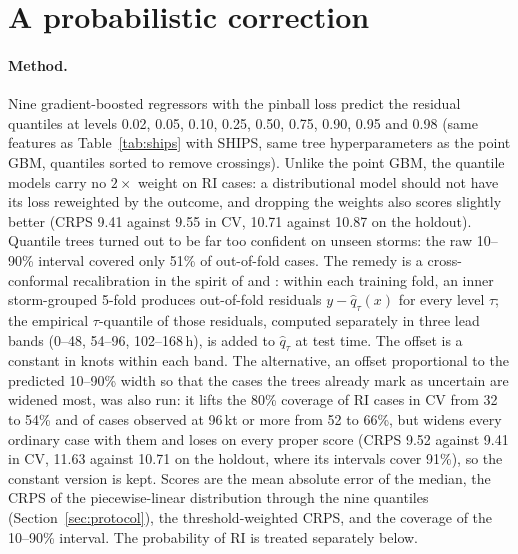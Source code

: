 \documentclass[11pt]{article}
\begin{document}
\FloatBarrier
\section{A probabilistic correction}\label{sec:prob}

\paragraph{Method.} Nine gradient-boosted regressors with the pinball loss predict the residual
quantiles at levels 0.02, 0.05, 0.10, 0.25, 0.50, 0.75, 0.90, 0.95 and 0.98 (same features as
Table~\ref{tab:ships} with SHIPS, same tree hyperparameters as the point GBM, quantiles sorted to
remove crossings). Unlike the point GBM, the quantile models carry no $2\times$ weight on RI
cases: a distributional model should not have its loss reweighted by the outcome, and dropping the
weights also scores slightly better (CRPS 9.41 against 9.55 in CV, 10.71 against 10.87 on the
holdout). Quantile trees turned out to be far too confident on
unseen storms: the raw 10--90\% interval covered only 51\% of out-of-fold cases. The remedy is a
cross-conformal recalibration in the spirit of \citet{romano2019cqr} and \citet{barber2021cvplus}:
within each training fold, an inner storm-grouped 5-fold produces out-of-fold residuals
$y - \hat q_\tau(x)$ for every level $\tau$; the empirical $\tau$-quantile of those residuals,
computed separately in three lead bands (0--48, 54--96, 102--168\,h), is added to $\hat q_\tau$
at test time. The offset is a constant in knots within each band. The alternative, an offset
proportional to the predicted 10--90\% width so that the cases the trees
already mark as uncertain are widened most, was also run: it lifts the 80\% coverage of RI cases
in CV from 32 to 54\% and of cases observed at 96\,kt or more from 52 to 66\%, but widens every
ordinary case with them and loses on every proper score (CRPS 9.52 against 9.41 in CV, 11.63
against 10.71 on the holdout, where its intervals cover 91\%), so the constant version is kept.
Scores are the mean absolute error of the median, the CRPS \citep{gneiting2007scoring} of the
piecewise-linear distribution through the nine quantiles (Section~\ref{sec:protocol}), the
threshold-weighted CRPS, and the coverage of the 10--90\% interval. The probability of RI is treated separately below.
\end{document}
